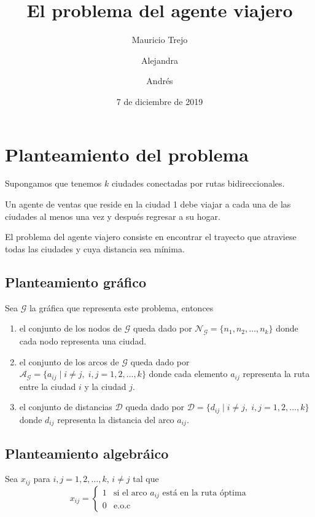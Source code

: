 \documentclass[12pt]{article}
\title{El problema del agente viajero}
\author{Mauricio Trejo \and Alejandra \and Andrés}
\date{7 de diciembre de 2019}
\theoremstyle{bfTheoremWithNote}
\theoremstyle{bfRemark}
\begin{document}
\maketitle

\section{Planteamiento del problema}

Supongamos que tenemos $k$ ciudades conectadas por rutas bidireccionales.

Un agente de ventas que reside en la ciudad 1 debe viajar a cada una de las ciudades al menos una vez y después regresar a su hogar. 

El problema del agente viajero consiste en encontrar el trayecto que atraviese todas las ciudades y cuya distancia sea mínima.

    \subsection{Planteamiento gráfico}

        Sea $\mathcal{G}$ la gráfica que representa este problema, entonces
        \begin{enumerate}
            \item el conjunto de los nodos de $\mathcal{G}$ queda dado por $\mathcal{N}_\mathcal{G} = \{n_1, n_2, \dots, n_k\}$ donde cada nodo representa una ciudad. 
            \item el conjunto de los arcos de $\mathcal{G}$ queda dado por $\mathcal{A}_\mathcal{G} = \{ a_{ij} \; | \; i \neq j, \; i,j = 1, 2, \dots, k \}$ donde cada elemento $a_{ij}$ representa la ruta entre la ciudad $i$ y la ciudad $j$.
            \item el conjunto de distancias $\mathcal{D}$ queda dado por $\mathcal{D} = \{ d_{ij} \; | \; i \neq j, \; i,j = 1, 2, \dots, k \}$ donde $d_{ij}$ representa la distancia del arco $a_{ij}$. 
        \end{enumerate}

    \subsection{Planteamiento algebráico}

        Sea $x_{ij}$ para $i,j = 1, 2, \dots, k$, $i \neq j$ tal que
        \begin{equation*}
            x_{ij} = 
            \begin{cases}
                1 &\text{si el arco $a_{ij}$ está en la ruta óptima} \\
                0 &\text{e.o.c} 
            \end{cases}
        \end{equation*}
        
\end{document}
